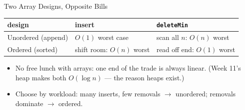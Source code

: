 \documentclass[aspectratio=169]{beamer}
\begin{document}
\begin{frame}{Two Array Designs, Opposite Bills}
  \begin{center}
  {\footnotesize
  \begin{tabular}{lll}
    \toprule
    \textbf{design} & \textbf{insert} & \textbf{\texttt{deleteMin}} \\
    \midrule
    Unordered (append) & $O(1)$ worst case & scan all $n$: $O(n)$ worst \\
    Ordered (sorted) & shift room: $O(n)$ worst & read off end: $O(1)$ worst \\
    \bottomrule
  \end{tabular}}
  \end{center}
  \begin{itemize}
    \item No free lunch with arrays: one end of the trade is always linear.
      (Week 11's heap makes both $O(\log n)$ --- the reason heaps exist.)
    \item Choose by workload: many inserts, few removals $\to$ unordered;
      removals dominate $\to$ ordered.
  \end{itemize}
\end{frame}
\end{document}
